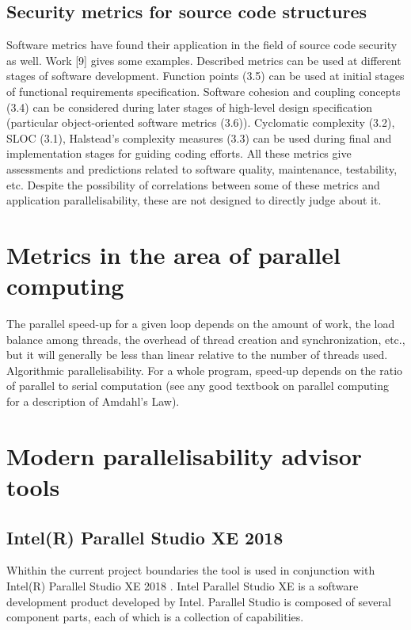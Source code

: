 \subsection{Security metrics for source code structures}
\qquad Software metrics have found their application in the field of source code security as well. Work [9] gives some examples. Described metrics can be used at different stages of software development. Function points (3.5) can be used at initial stages of functional requirements specification. Software cohesion and coupling concepts (3.4) can be considered during later stages of high-level design specification (particular object-oriented software metrics (3.6)). Cyclomatic complexity (3.2), SLOC (3.1), Halstead's complexity measures (3.3) can be used during final and implementation stages for guiding coding efforts. All these metrics give assessments and predictions related to software quality, maintenance, testability, etc. Despite the possibility of correlations between some of these metrics and application parallelisability, these are not designed to directly judge about it.

\section{Metrics in the area of parallel computing}
\cite{parallel-performance-metrics-paper}

The parallel speed-up for a given loop depends on the amount of work, the load balance among threads, the overhead of thread creation and synchronization, etc., but it will generally be less than linear relative to the number of threads used. Algorithmic parallelisability. For a whole program, speed-up depends on the ratio of parallel to serial computation (see any good textbook on parallel computing for a description of Amdahl's Law).

\section{Modern parallelisability advisor tools}
\label{background-modern-parallelisability-advisor-tools}
\subsection{Intel(R) Parallel Studio XE 2018}
\qquad Whithin the current project boundaries the tool is used in conjunction with Intel(R) Parallel Studio XE 2018 \cite{intel-parallel-studio}. Intel Parallel Studio XE is a software development product developed by Intel. Parallel Studio is composed of several component parts, each of which is a collection of capabilities. 

